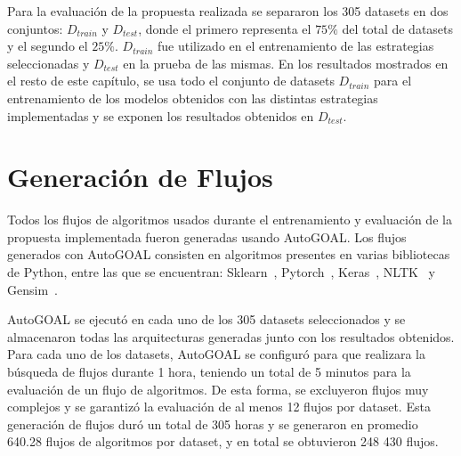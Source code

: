  
 Para la evaluación de la propuesta realizada se separaron los 305 datasets en dos conjuntos: $D_{train}$ y $D_{test}$, donde el primero representa el $75\%$ del total de datasets y el segundo el $25\%$. $D_{train}$ fue utilizado en el entrenamiento de las estrategias seleccionadas y $D_{test}$ en la prueba de las mismas. %
 En los resultados mostrados en el resto de este capítulo, se usa todo el conjunto de datasets $D_{train}$ para el entrenamiento de los modelos obtenidos con las distintas estrategias implementadas y se exponen los resultados obtenidos en $D_{test}$.

 
 \section{Generación de Flujos}\label{sec:flujos}
 

Todos los flujos de algoritmos usados durante el entrenamiento y evaluación de la propuesta implementada fueron generadas usando AutoGOAL. Los flujos generados con AutoGOAL consisten en algoritmos presentes en varias bibliotecas de Python, entre las que se encuentran: Sklearn~\cite{scikit-learn}, Pytorch~\cite{paszke2019pytorch}, Keras~\cite{chollet2015keras}, NLTK~\cite{bird2009natural} y Gensim~\cite{khosrovian2008gensim}.

AutoGOAL se ejecutó en cada uno de los 305 datasets seleccionados y se almacenaron todas las arquitecturas generadas junto con los resultados obtenidos. Para cada uno de los datasets, AutoGOAL se configuró para que realizara la búsqueda de flujos durante 1 hora, teniendo un total de 5 minutos para la evaluación de un flujo de algoritmos. De esta forma, se excluyeron flujos muy complejos y se garantizó la evaluación de al menos 12 flujos por dataset. Esta generación de flujos duró un total de 305 horas y se generaron en promedio 640.28 flujos de algoritmos por dataset, y en total se obtuvieron 248 430  flujos. 

